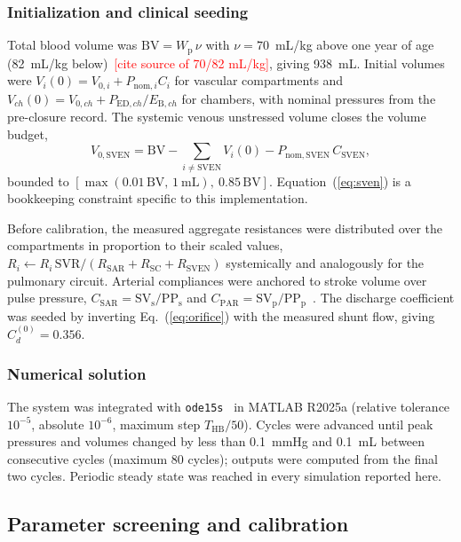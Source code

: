 \subsubsection{Initialization and clinical seeding}
Total blood volume was $\mathrm{BV} = W_{\mathrm{p}}\,\nu$ with $\nu = 70$~mL/kg above one year of age (82~mL/kg below)~\textcolor{red}{[cite source of 70/82 mL/kg]}, giving 938~mL. Initial volumes were $V_i(0) = V_{0,i} + P_{\mathrm{nom},i} C_i$ for vascular compartments and $V_{ch}(0) = V_{0,ch} + P_{\mathrm{ED},ch}/E_{\mathrm{B},ch}$ for chambers, with nominal pressures from the pre-closure record. The systemic venous unstressed volume closes the volume budget,
\begin{equation}
V_{0,\mathrm{SVEN}} = \mathrm{BV} - \sum_{i \neq \mathrm{SVEN}} V_i(0) - P_{\mathrm{nom,SVEN}}\,C_{\mathrm{SVEN}},
\label{eq:sven}
\end{equation}
bounded to $[\max(0.01\,\mathrm{BV},\,1~\mathrm{mL}),\ 0.85\,\mathrm{BV}]$. Equation~(\ref{eq:sven}) is a bookkeeping constraint specific to this implementation.

Before calibration, the measured aggregate resistances were distributed over the compartments in proportion to their scaled values, $R_i \leftarrow R_i\,\mathrm{SVR}/(R_{\mathrm{SAR}}+R_{\mathrm{SC}}+R_{\mathrm{SVEN}})$ systemically and analogously for the pulmonary circuit. Arterial compliances were anchored to stroke volume over pulse pressure, $C_{\mathrm{SAR}} = \mathrm{SV}_{\mathrm{s}}/\mathrm{PP}_{\mathrm{s}}$ and $C_{\mathrm{PAR}} = \mathrm{SV}_{\mathrm{p}}/\mathrm{PP}_{\mathrm{p}}$~\cite{Colebank2026}. The discharge coefficient was seeded by inverting Eq.~(\ref{eq:orifice}) with the measured shunt flow, giving $C_d^{(0)} = 0.356$.

\subsubsection{Numerical solution}
The system was integrated with \texttt{ode15s}~\cite{Shampine1997} in MATLAB R2025a (relative tolerance $10^{-5}$, absolute $10^{-6}$, maximum step $T_{\mathrm{HB}}/50$). Cycles were advanced until peak pressures and volumes changed by less than 0.1~mmHg and 0.1~mL between consecutive cycles (maximum 80 cycles); outputs were computed from the final two cycles. Periodic steady state was reached in every simulation reported here.

\subsection{Parameter screening and calibration}
\label{sec:calibration}


